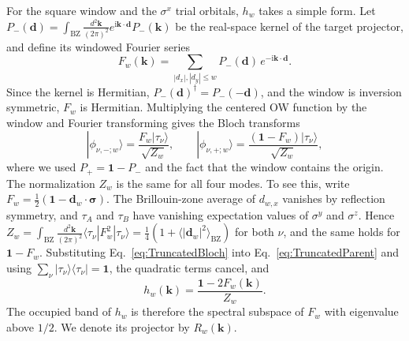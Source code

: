 \documentclass[aps,prb,10pt,twocolumn,superscriptaddress,longbibliography,floatfix]{revtex4-2}
\newcommand{\ii}{\mathrm{i}}
\newcommand{\mr}[1]{\mathrm{#1}}
\newcommand{\Id}{\mathbf{1}}
\newcommand{\bk}{\boldsymbol k}
\begin{document}
{\color{orange}
For the square window and the $\sigma^x$ trial orbitals, $h_w$ takes a simple form. Let $P_-(\boldsymbol d)=\int_{\mr{BZ}}\frac{d^2\bk}{(2\pi)^2}e^{\ii\bk\cdot\boldsymbol d}P_-(\bk)$ be the real-space kernel of the target projector, and define its windowed Fourier series
\begin{equation}
    F_w(\bk)=\sum_{|d_x|,|d_y|\leq w}P_-(\boldsymbol d)\,e^{-\ii\bk\cdot\boldsymbol d}.
    \label{eq:WindowedProjector}
\end{equation}
Since the kernel is Hermitian, $P_-(\boldsymbol d)^\dagger=P_-(-\boldsymbol d)$, and the window is inversion symmetric, $F_w$ is Hermitian. Multiplying the centered OW function by the window and Fourier transforming gives the Bloch transforms
\begin{equation}
    |\phi_{\nu,-;w}\rangle=\frac{F_w|\tau_\nu\rangle}{\sqrt{Z_w}},
    \qquad
    |\phi_{\nu,+;w}\rangle=\frac{(\Id-F_w)|\tau_\nu\rangle}{\sqrt{Z_w}},
    \label{eq:TruncatedBloch}
\end{equation}
where we used $P_+=\Id-P_-$ and the fact that the window contains the origin. The normalization $Z_w$ is the same for all four modes. To see this, write $F_w=\frac12(\Id-\boldsymbol d_w\cdot\boldsymbol\sigma)$. The Brillouin-zone average of $d_{w,x}$ vanishes by reflection symmetry, and $\tau_A$ and $\tau_B$ have vanishing expectation values of $\sigma^y$ and $\sigma^z$. Hence $Z_w=\int_{\mr{BZ}}\frac{d^2\bk}{(2\pi)^2}\langle\tau_\nu|F_w^2|\tau_\nu\rangle=\frac14(1+\langle|\boldsymbol d_w|^2\rangle_{\mr{BZ}})$ for both $\nu$, and the same holds for $\Id-F_w$. Substituting Eq.~\eqref{eq:TruncatedBloch} into Eq.~\eqref{eq:TruncatedParent} and using $\sum_\nu|\tau_\nu\rangle\langle\tau_\nu|=\Id$, the quadratic terms cancel, and
\begin{equation}
    h_w(\bk)=\frac{\Id-2F_w(\bk)}{Z_w}.
    \label{eq:FrameIdentity}
\end{equation}
The occupied band of $h_w$ is therefore the spectral subspace of $F_w$ with eigenvalue above $1/2$. We denote its projector by $R_w(\bk)$.

}
\end{document}
